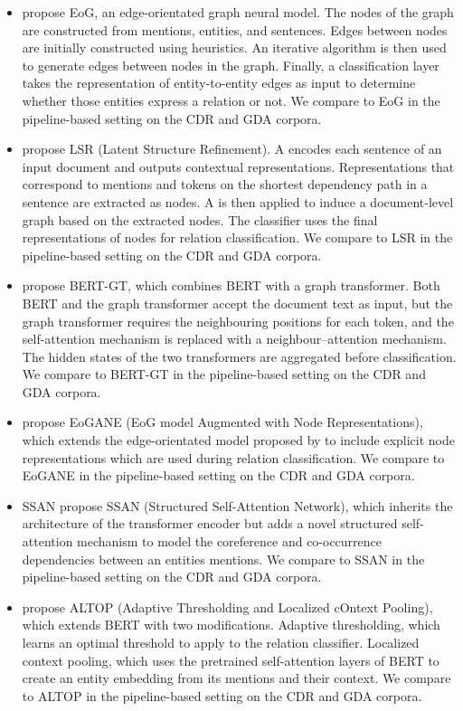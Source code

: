 \documentclass[11pt]{article}
\begin{document}
\begin{itemize}
    \item \citet{christopoulou-etal-2019-connecting} propose EoG, an edge-orientated graph neural model. The nodes of the graph are constructed from mentions, entities, and sentences. Edges between nodes are initially constructed using heuristics. An iterative algorithm is then used to generate edges between nodes in the graph. Finally, a classification layer takes the representation of entity-to-entity edges as input to determine whether those entities express a relation or not. We compare to EoG in the pipeline-based setting on the CDR and GDA corpora.
    \item \citet{nan-etal-2020-reasoning} propose LSR (Latent Structure Refinement). A  encodes each sentence of an input document and outputs contextual representations. Representations that correspond to mentions and tokens on the shortest dependency path in a sentence are extracted as nodes. A  is then applied to induce a document-level graph based on the extracted nodes. The classifier uses the final representations of nodes for relation classification. We compare to LSR in the pipeline-based setting on the CDR and GDA corpora.
    \item \citet{lai2020bert} propose BERT-GT, which combines BERT with a graph transformer. Both BERT and the graph transformer accept the document text as input, but the graph transformer requires the neighbouring positions for each token, and the self-attention mechanism is replaced with a neighbour–attention mechanism. The hidden states of the two transformers are aggregated before classification. We compare to BERT-GT in the pipeline-based setting on the CDR and GDA corpora.
    \item \citet{minh-tran-etal-2020-dots} propose EoGANE (EoG model Augmented with Node Representations), which extends the edge-orientated model proposed by \citet{christopoulou-etal-2019-connecting} to include explicit node representations which are used during relation classification. We compare to EoGANE in the pipeline-based setting on the CDR and GDA corpora.
    \item SSAN \citep{Xu2021EntitySW} propose SSAN (Structured Self-Attention Network), which inherits the architecture of the transformer encoder \citep{vaswani2017attention} but adds a novel structured self-attention mechanism to model the coreference and co-occurrence dependencies between an entities mentions. We compare to SSAN in the pipeline-based setting on the CDR and GDA corpora.
    \item \citet{zhou2021document} propose ALTOP (Adaptive Thresholding and Localized cOntext Pooling), which extends BERT with two modifications. Adaptive thresholding, which learns an optimal threshold to apply to the relation classifier. Localized context pooling, which uses the pretrained self-attention layers of BERT to create an entity embedding from its mentions and their context. We compare to ALTOP in the pipeline-based setting on the CDR and GDA corpora.
\end{itemize}
\end{document}
